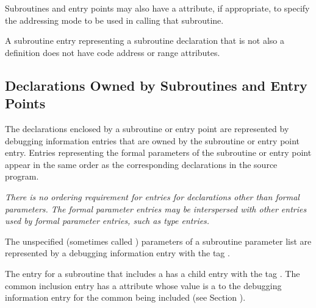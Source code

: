 
Subroutines and entry points may also have
\bb
a \DWATaddressclassDEFN{}
attribute, if
\eb
appropriate, to specify
\db
the addressing mode to be used in calling that subroutine.

A subroutine entry representing a subroutine declaration
that is not also a definition does not have code address or
range attributes.


\subsection{Declarations Owned by Subroutines and Entry Points}
\label{chap:declarationsownedbysubroutinesandentrypoints}
The declarations enclosed by a subroutine or entry point are
represented by debugging information entries that are owned
by the subroutine or entry point entry. Entries representing
the formal parameters of the subroutine or entry point appear
in the same order as the corresponding declarations in the
source program.

\textit{There is no ordering requirement for entries for declarations
other than formal parameters. The formal parameter
entries may be interspersed with other entries used by formal
parameter entries, such as type entries.}

The unspecified (sometimes called )
parameters of a subroutine parameter list are
represented by a debugging information
entry
with the tag \DWTAGunspecifiedparametersTARG.

The entry for a subroutine that includes a
has a child entry with the
tag \DWTAGcommoninclusionTARG.
The\hypertarget{chap:commonreferencecommonblockusage}{}
common inclusion entry has a
\DWATcommonreferenceDEFN{} attribute
whose value is a 
to the debugging information entry
for the common  being included
(see Section ).

